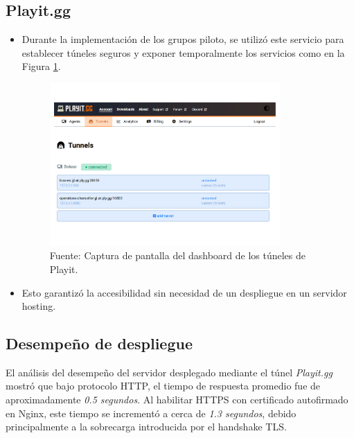 \documentclass[letter,oneside,12pt,spanish]{report}
\begin{document}
\subsection{Playit.gg}
\begin{itemize}
    \item Durante la implementación de los grupos piloto, se utilizó este servicio para establecer túneles seguros y exponer temporalmente los servicios como en la Figura \ref{fig:Playit}.
    
	\begin{figure}[ht]
		\centering
		\includegraphics[width=0.83\textwidth]{Figs/dashboard playit.gg.pdf}
		\label{fig:Playit}
		\\Fuente: Captura de pantalla del dashboard de los túneles de Playit.
	\end{figure}
	
	\item Esto garantizó la accesibilidad sin necesidad de un despliegue en un servidor hosting.
\end{itemize}

\subsection{Desempeño de despliegue}

El análisis del desempeño del servidor desplegado mediante el túnel \textit{Playit.gg} mostró que bajo protocolo HTTP, el tiempo de respuesta promedio fue de aproximadamente \textit{0.5 segundos}. Al habilitar HTTPS con certificado autofirmado en Nginx, este tiempo se incrementó a cerca de \textit{1.3 segundos}, debido principalmente a la sobrecarga introducida por el handshake TLS.
\end{document}
